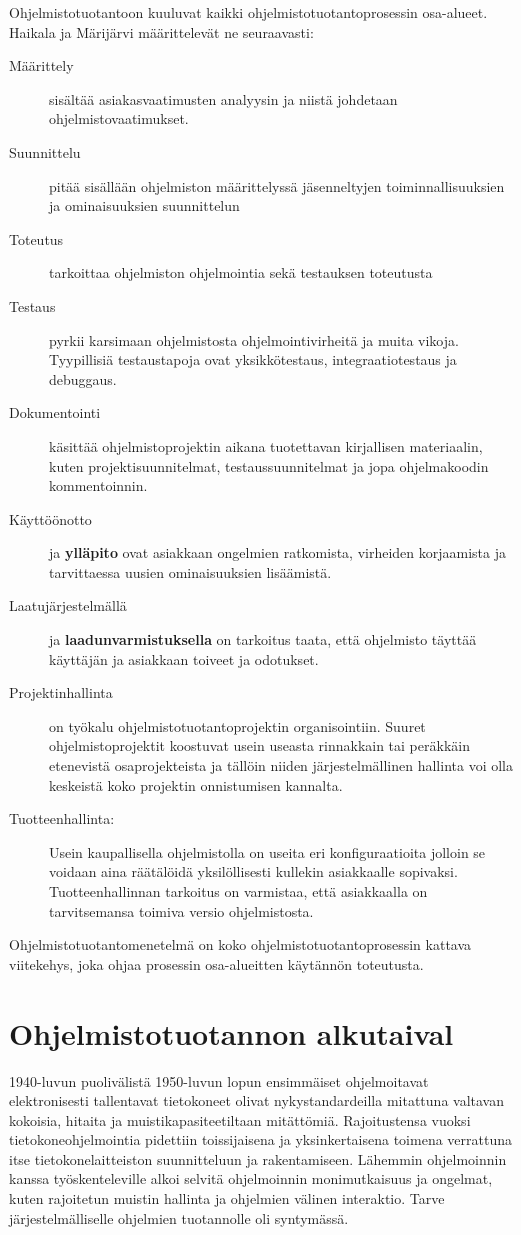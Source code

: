 \documentclass[finnish,12pt]{tktltiki2}
\theoremstyle{definition}
\theoremstyle{remark}
\begin{document}
Ohjelmistotuotantoon kuuluvat kaikki ohjelmistotuotantoprosessin osa-alueet. Haikala ja Märijärvi \cite{haikala2003ohjelmistotuotanto} määrittelevät ne seuraavasti:

\begin{description}
\item[Määrittely] sisältää asiakasvaatimusten analyysin ja niistä johdetaan ohjelmistovaatimukset.
\item[Suunnittelu] pitää sisällään ohjelmiston määrittelyssä jäsenneltyjen toiminnallisuuksien ja ominaisuuksien suunnittelun
\item[Toteutus] tarkoittaa ohjelmiston ohjelmointia sekä testauksen toteutusta
\item[Testaus] pyrkii karsimaan ohjelmistosta ohjelmointivirheitä ja muita vikoja. Tyypillisiä testaustapoja ovat yksikkötestaus, integraatiotestaus ja debuggaus.
\item[Dokumentointi] käsittää ohjelmistoprojektin aikana tuotettavan kirjallisen materiaalin, kuten projektisuunnitelmat, testaussuunnitelmat ja jopa ohjelmakoodin kommentoinnin.
\item[Käyttöönotto] ja \textbf{ylläpito} ovat asiakkaan ongelmien ratkomista, virheiden korjaamista ja tarvittaessa uusien ominaisuuksien lisäämistä.  
\item[Laatujärjestelmällä] ja \textbf{laadunvarmistuksella} on tarkoitus taata, että ohjelmisto täyttää käyttäjän ja asiakkaan toiveet ja odotukset.
\item[Projektinhallinta] on työkalu ohjelmistotuotantoprojektin organisointiin. Suuret ohjelmistoprojektit koostuvat usein useasta rinnakkain tai peräkkäin etenevistä osaprojekteista ja tällöin niiden järjestelmällinen hallinta voi olla keskeistä koko projektin onnistumisen kannalta. 
\item[Tuotteenhallinta:] Usein kaupallisella ohjelmistolla on useita eri konfiguraatioita jolloin se voidaan aina räätälöidä yksilöllisesti kullekin asiakkaalle sopivaksi. Tuotteenhallinnan tarkoitus on varmistaa, että asiakkaalla on tarvitsemansa toimiva versio ohjelmistosta.
\end{description}
Ohjelmistotuotantomenetelmä on koko ohjelmistotuotantoprosessin kattava viitekehys, joka ohjaa prosessin osa-alueitten käytännön toteutusta.

\section{Ohjelmistotuotannon alkutaival}
1940-luvun puolivälistä 1950-luvun lopun ensimmäiset ohjelmoitavat elektronisesti tallentavat tietokoneet olivat nykystandardeilla mitattuna valtavan kokoisia, hitaita ja muistikapasiteetiltaan mitättömiä. Rajoitustensa vuoksi tietokoneohjelmointia pidettiin toissijaisena ja yksinkertaisena toimena verrattuna itse tietokonelaitteiston suunnitteluun ja rakentamiseen. \cite{DBLP:reference/se/Grier10} Lähemmin ohjelmoinnin kanssa työskenteleville alkoi selvitä ohjelmoinnin monimutkaisuus ja ongelmat, kuten rajoitetun muistin hallinta ja ohjelmien välinen interaktio. Tarve järjestelmälliselle ohjelmien tuotannolle oli syntymässä.
\end{document}
